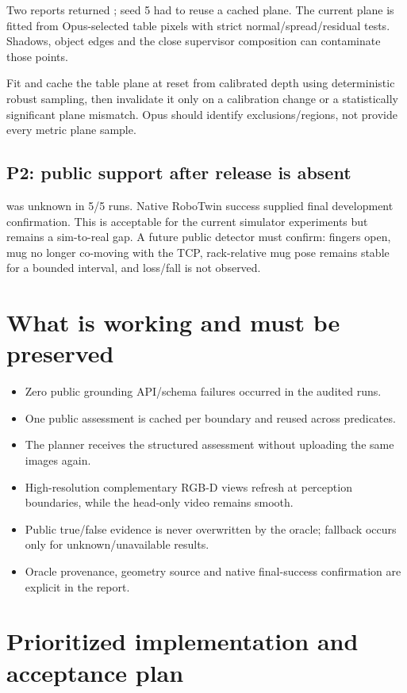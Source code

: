 \documentclass[10pt]{article}
\newcommand{\code}[1]{\texttt{\detokenize{#1}}}
\begin{document}
Two reports returned \code{table_plane_invalid}; seed 5 had to reuse a cached plane. The current
plane is fitted from Opus-selected table pixels with strict normal/spread/residual tests. Shadows,
object edges and the close supervisor composition can contaminate those points.

Fit and cache the table plane at reset from calibrated depth using deterministic robust sampling,
then invalidate it only on a calibration change or a statistically significant plane mismatch.
Opus should identify exclusions/regions, not provide every metric plane sample.

\subsection{P2: public support after release is absent}

\code{public_support} was unknown in 5/5 runs. Native RoboTwin success supplied final development
confirmation. This is acceptable for the current simulator experiments but remains a sim-to-real
gap. A future public detector must confirm: fingers open, mug no longer co-moving with the TCP,
rack-relative mug pose remains stable for a bounded interval, and loss/fall is not observed.

\section{What is working and must be preserved}

\begin{itemize}
  \item Zero public grounding API/schema failures occurred in the audited runs.
  \item One public assessment is cached per boundary and reused across predicates.
  \item The planner receives the structured assessment without uploading the same images again.
  \item High-resolution complementary RGB-D views refresh at perception boundaries, while the
        head-only video remains smooth.
  \item Public true/false evidence is never overwritten by the oracle; fallback occurs only for
        unknown/unavailable results.
  \item Oracle provenance, geometry source and native final-success confirmation are explicit in
        the report.
\end{itemize}

\section{Prioritized implementation and acceptance plan}
\end{document}

